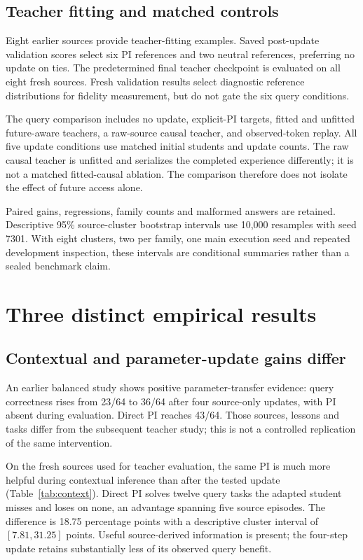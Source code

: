 \documentclass[11pt,letterpaper]{article}
\begin{document}
\subsection{Teacher fitting and matched controls}

Eight earlier sources provide teacher-fitting examples. Saved post-update validation scores select six PI references and two neutral references, preferring no update on ties. The predetermined final teacher checkpoint is evaluated on all eight fresh sources. Fresh validation results select diagnostic reference distributions for fidelity measurement, but do not gate the six query conditions.

The query comparison includes no update, explicit-PI targets, fitted and unfitted future-aware teachers, a raw-source causal teacher, and observed-token replay. All five update conditions use matched initial students and update counts. The raw causal teacher is unfitted and serializes the completed experience differently; it is not a matched fitted-causal ablation. The comparison therefore does not isolate the effect of future access alone.

Paired gains, regressions, family counts and malformed answers are retained. Descriptive 95\% source-cluster bootstrap intervals use 10,000 resamples with seed 7301. With eight clusters, two per family, one main execution seed and repeated development inspection, these intervals are conditional summaries rather than a sealed benchmark claim.

\section{Three distinct empirical results}
\label{sec:results}

\subsection{Contextual and parameter-update gains differ}

An earlier balanced study shows positive parameter-transfer evidence: query correctness rises from 23/64 to 36/64 after four source-only updates, with PI absent during evaluation. Direct PI reaches 43/64. Those sources, lessons and tasks differ from the subsequent teacher study; this is not a controlled replication of the same intervention.

On the fresh sources used for teacher evaluation, the same PI is much more helpful during contextual inference than after the tested update (Table~\ref{tab:context}). Direct PI solves twelve query tasks the adapted student misses and loses on none, an advantage spanning five source episodes. The difference is 18.75 percentage points with a descriptive cluster interval of $[7.81,31.25]$ points. Useful source-derived information is present; the four-step update retains substantially less of its observed query benefit.
\end{document}
